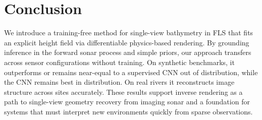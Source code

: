 \section{Conclusion}
\label{sec:conclusion}
We introduce a training-free method for single-view bathymetry in FLS that fits an explicit height field via differentiable physics-based rendering. By grounding inference in the forward sonar process and simple priors, our approach transfers across sensor configurations without training. On synthetic benchmarks, it outperforms or remains near-equal to a supervised CNN out of distribution, while the CNN remains best in distribution. On real rivers it reconstructs image structure across sites accurately. These results support inverse rendering as a path to single-view geometry recovery from imaging sonar and a foundation for systems that must interpret new environments quickly from sparse observations.

